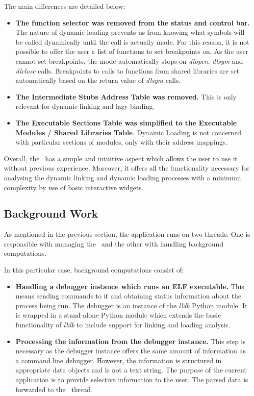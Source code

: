 The main differences are detailed below:
\begin{itemize}
\item \textbf{The function selector was removed from the status and control bar.} The nature of dynamic loading prevents us from knowing what symbols will be called dynamically until the call is actually made. For this reason, it is not possible to offer the user a list of functions to set breakpoints on. As the user cannot set breakpoints, the mode automatically stops on \textit{dlopen}, \textit{dlsym} and \textit{dlclose} calls. Breakpoints to calls to functions from shared libraries are set automatically based on the return value of \textit{dlsym} calls.
\item \textbf{The Intermediate Stubs Address Table was removed.} This is only relevant for dynamic linking and lazy binding.
\item \textbf{The Executable Sections Table was simplified to the Executable Modules / Shared Libraries Table}. Dynamic Loading is not concerned with particular sections of modules, only with their address mappings.
\end{itemize}

Overall, the \gui\ has a simple and intuitive aspect which allows the user to use it without previous experience. Moreover, it offers all the functionality necessary for analysing the dynamic linking and dynamic loading processes with a minimum complexity by use of basic interactive widgets.

\subsection{Background Work}
\label{sub-sec:background-work-implem}

As mentioned in the previous section, the application runs on two threads. One is responsible with managing the \gui\ and the other with handling background computations.

In this particular case, background computations consist of:
\begin{itemize}
\item \textbf{Handling a debugger instance which runs an ELF executable.} This means sending commands to it and obtaining status information about the process being run. The debugger is an instance of the \textit{lldb} Python module. It is wrapped in a stand-alone Python module which extends the basic functionality of \textit{lldb} to include support for linking and loading analysis.
\item \textbf{Processing the information from the debugger instance.} This step is necessary as the debugger instance offers the same amount of information as a command line debugger. However, the information is structured in appropriate data objects and is not a text string. The purpose of the current application is to provide selective information to the user. The parsed data is forwarded to the \gui\ thread.
\end{itemize}

